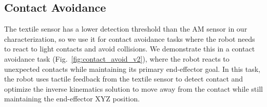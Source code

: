 \subsection{Contact Avoidance}
The textile sensor has a lower detection threshold than the AM sensor in our characterization, so we use it for contact avoidance tasks where the robot needs to react to light contacts and avoid collisions. We demonstrate this in a contact avoidance task (Fig.~\ref{fig:contact_avoid_v2}), where the robot reacts to unexpected contacts while maintaining its primary end-effector goal. In this task, the robot uses tactile feedback from the textile sensor to detect contact and optimize the inverse kinematics solution to move away from the contact while still maintaining the end-effector XYZ position.
